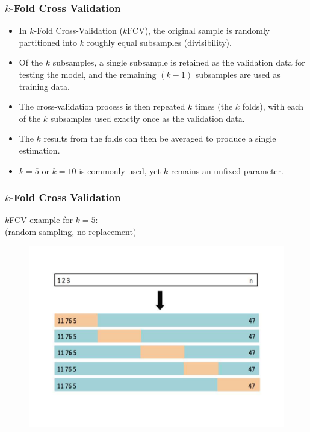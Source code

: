 \documentclass{beamer}
\begin{document}

\begin{frame}
\frametitle{$k$-Fold Cross Validation}

\begin{itemize}
  \item In $k$-Fold Cross-Validation ($k$FCV), the original sample is randomly partitioned into $k$ roughly equal subsamples (divisibility). 
  \item Of the $k$ subsamples, a single subsample is retained as the validation data for testing the model, and the remaining $(k-1)$ subsamples are used as training data. 
  \item The cross-validation process is then repeated $k$ times (the $k$ folds), with each of the $k$ subsamples used exactly once as the validation data. 
  \item The $k$ results from the folds can then be averaged to produce a single estimation. 
  \item $k = 5$ or $k=10$ is commonly used, yet $k$ remains an unfixed parameter.
\end{itemize}  

\end{frame}




\begin{frame}
\frametitle{$k$-Fold Cross Validation}

\begin{center}
$k$FCV example for $k=5$: \\
(random sampling, no replacement)
\begin{figure}
\includegraphics[width=0.6\linewidth]{IMG/kFCV2.pdf}
\end{figure}
\end{center}

\end{frame}
\end{document}
